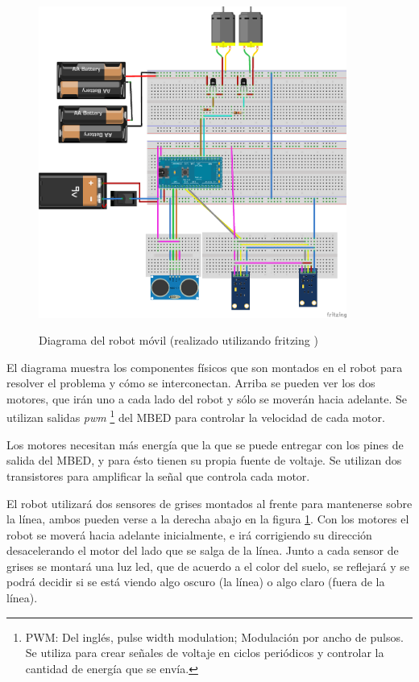 \begin{figure}[hbtp]
\begin{center}
  \caption{Diagrama del robot móvil
    (realizado utilizando fritzing \cite{fritzing})
  }
\includegraphics[width=0.9\textwidth]{graphs/breaboardbb.png}
\label{fig:deliverybot}
\end{center}
\end{figure}

  El diagrama muestra los componentes físicos que son montados en el robot
para resolver el problema y cómo se interconectan.
  Arriba se pueden ver los dos motores, que irán uno a cada lado
del robot y sólo se moverán hacia adelante.
  Se utilizan salidas \textit{pwm} \footnote{PWM: Del inglés, pulse width
modulation; Modulación por ancho de pulsos. Se utiliza para crear señales
de voltaje en ciclos periódicos y controlar la cantidad de energía que
se envía.} del MBED para controlar la velocidad de cada motor.

  Los motores necesitan más energía que la que se puede entregar con
los pines de salida del MBED, y para ésto tienen su propia fuente de
voltaje.
  Se utilizan dos transistores para amplificar la señal que
controla cada motor.

  El robot utilizará dos sensores de grises montados al frente
para mantenerse sobre la línea, ambos pueden verse a la derecha abajo
en la figura \ref{fig:deliverybot}.
  Con los motores el robot se moverá hacia adelante inicialmente, e
irá corrigiendo su dirección desacelerando el motor del lado que
se salga de la línea.
  Junto a cada sensor de grises se montará una luz led, que de acuerdo
a el color del suelo, se reflejará y se podrá decidir si se está viendo
algo oscuro (la línea) o algo claro (fuera de la línea).

